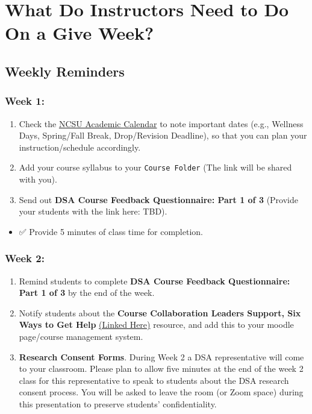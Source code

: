 \documentclass[
]{book}
\providecommand{\tightlist}{%
  \setlength{\itemsep}{0pt}\setlength{\parskip}{0pt}}
\begin{document}
\hfill\break

\chapter{What Do Instructors Need to Do On a Give Week?}\label{what-do-instructors-need-to-do-on-a-give-week}

\section{Weekly Reminders}\label{weekly-reminders}

\subsection{Week 1:}\label{week-1}

\begin{enumerate}
\def\labelenumi{\arabic{enumi})}
\item
  Check the \href{https://studentservices.ncsu.edu/calendars/academic/}{NCSU Academic Calendar} to note important dates (e.g., Wellness Days, Spring/Fall Break, Drop/Revision Deadline), so that you can plan your instruction/schedule accordingly.
\item
  Add your course syllabus to your \texttt{Course\ Folder} (The link will be shared with you).
\item
  Send out { \textbf{DSA Course Feedback Questionnaire: Part 1 of 3} } (Provide your students with the link here: TBD).
\end{enumerate}

\begin{itemize}
\tightlist
\item
  ✅ Provide 5 minutes of class time for completion.
\end{itemize}

\subsection{Week 2:}\label{week-2}

\begin{enumerate}
\def\labelenumi{\arabic{enumi})}
\item
  Remind students to complete \textbf{DSA Course Feedback Questionnaire: Part 1 of 3} by the end of the week.
\item
  Notify students about the \textbf{Course Collaboration Leaders Support, Six Ways to Get Help} \href{https://docs.google.com/document/d/1HHNjCbm_W4CEdBWgecMDRpI64hqvmsZZ1Tq8qpudjWo/edit?usp=sharing}{(Linked Here)} resource, and add this to your moodle page/course management system.
\item
  \textbf{Research Consent Forms}. During Week 2 a DSA representative will come to your classroom. Please plan to allow five minutes at the end of the week 2 class for this representative to speak to students about the DSA research consent process. You will be asked to leave the room (or Zoom space) during this presentation to preserve students' confidentiality.
\end{enumerate}
\end{document}
